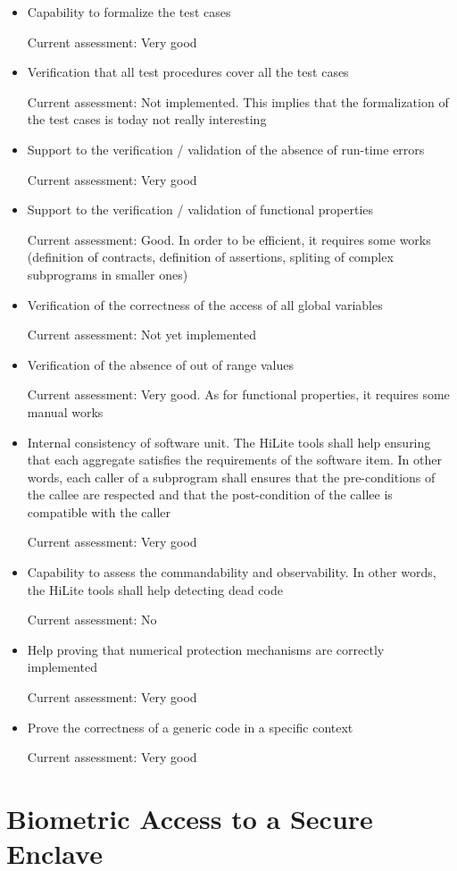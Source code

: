 \documentclass[10pt,a4paper,twocolumn]{article}
\begin{document}
\begin{itemize}
\item Capability to formalize the test cases

Current assessment: Very good
\item Verification that all test procedures cover all the test cases

Current assessment: Not implemented. This implies that the formalization of the test cases is today not really interesting
\item Support to the verification / validation of the absence of run-time errors

Current assessment: Very good
\item Support to the verification / validation of functional properties

Current assessment: Good. In order to be efficient, it requires some works (definition of contracts, definition of assertions, spliting of complex subprograms in smaller ones)
\item Verification of the correctness of the access of all global variables

Current assessment: Not yet implemented
\item Verification of the absence of out of range values

Current assessment: Very good. As for functional properties, it requires some manual works
\item Internal consistency of software unit. The HiLite tools shall help ensuring that each aggregate satisfies the requirements of the software item. In other words, each caller of a subprogram shall ensures that the pre-conditions of the callee are respected and that the post-condition of the callee is compatible with the caller

Current assessment: Very good
\item Capability to assess the commandability and observability. In other words, the HiLite tools shall help detecting dead code

Current assessment: No
\item Help proving that numerical protection mechanisms are correctly implemented

Current assessment: Very good
\item Prove the correctness of a generic code in a specific context

Current assessment: Very good
\end{itemize}
\fi

\section{Biometric Access to a Secure Enclave}
\end{document}
